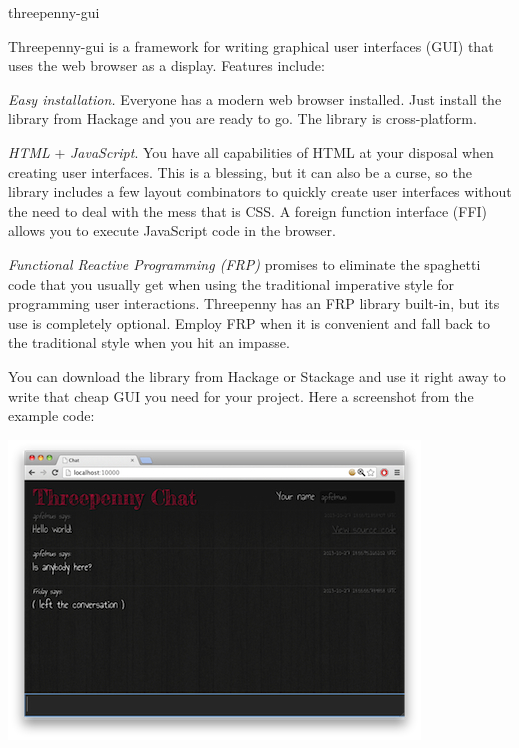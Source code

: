 \begin{hcarentry}[updated]{threepenny-gui}
\label{threepenny-gui}
\makeheader

Threepenny-gui is a framework for writing graphical user interfaces (GUI) that
uses the web browser as a display. Features include:

\begin{compactitem}
\item \emph{Easy installation.} Everyone has a modern web browser
  installed. Just install the library from Hackage and you are ready to go.
  The library is cross-platform.
\item \emph{HTML} + \emph{JavaScript}. You have all capabilities of HTML at
  your disposal when creating user interfaces. This is a blessing, but it can
  also be a curse, so the library includes a few layout combinators to quickly
  create user interfaces without the need to deal with the mess that is CSS. A
  foreign function interface (FFI) allows you to execute JavaScript code in
  the browser.
\item \emph{Functional Reactive Programming (FRP)} promises to eliminate the
  spaghetti code that you usually get when using the traditional imperative
  style for programming user interactions. Threepenny has an FRP library
  built-in, but its use is completely optional. Employ FRP when it is
  convenient and fall back to the traditional style when you hit an impasse.
\end{compactitem}

You can download the library from Hackage or Stackage and use it right away to
write that cheap GUI you need for your project. Here a screenshot from the
example code:

\begin{center}
\includegraphics[width=\columnwidth]{html/chat.jpg}
\end{center}


\end{hcarentry}
